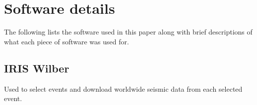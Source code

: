 \documentclass[11pt,a4paper]{article}
\begin{document}
\appendix
\section{Software details}
The following lists the software used in this paper along with brief descriptions of what each piece of software was used for.
\subsection{IRIS Wilber}
Used to select events and download worldwide seismic data from each selected event.
\newpage


\end{document}
